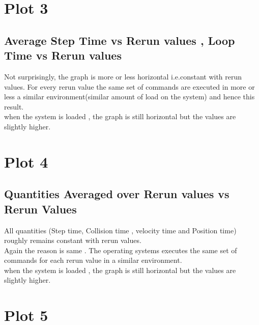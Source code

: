 \documentclass[a4paper,11pt]{report}
\begin{document}
\section{Plot 3}
\subsection{Average Step Time vs Rerun values ,  Loop Time vs Rerun values} 
Not surprisingly, the graph is more or less horizontal i.e.constant with rerun values. For every rerun value the same set of commands are executed in more or less a similar environment(similar amount of load on the system) and hence this result.\\
when the system is loaded , the graph is still horizontal but the values are slightly higher.

\section{Plot 4}
\subsection{Quantities Averaged over Rerun values vs Rerun Values} 
All quantities (Step time, Collision time , velocity time and Position time) roughly remains constant with rerun values.\\
Again the reason is same . The operating systems executes the same set of commands for each rerun value in a similar environment.\\
when the system is loaded , the graph is still horizontal but the values are slightly higher.\\

\section{Plot 5}
\end{document}
